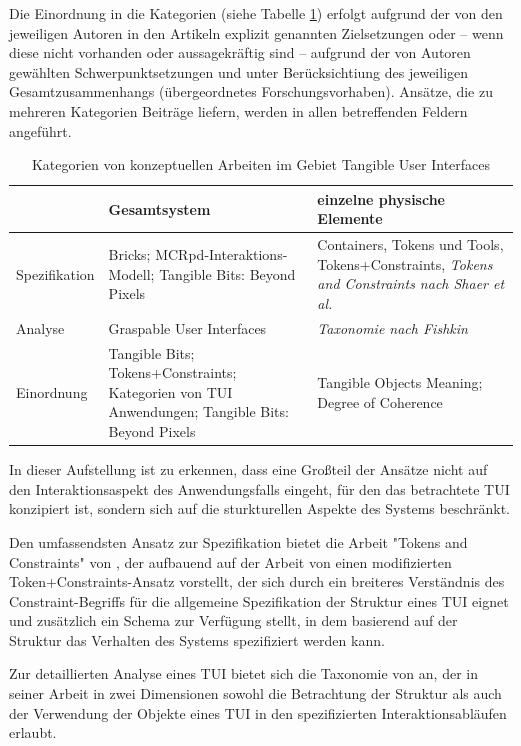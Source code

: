 Die Einordnung in die Kategorien (siehe Tabelle \ref{tab:tui_konzeptkategorien}) erfolgt aufgrund der von den jeweiligen Autoren in den Artikeln explizit genannten Zielsetzungen oder -- wenn diese nicht vorhanden oder aussagekräftig sind -- aufgrund der von Autoren gewählten Schwerpunktsetzungen und unter Berücksichtiung des jeweiligen Gesamtzusammenhangs (übergeordnetes Forschungsvorhaben). Ansätze, die zu mehreren Kategorien Beiträge liefern, werden in allen betreffenden Feldern angeführt.

\begin{table}[htbp]
	\centering
	\caption{Kategorien von konzeptuellen Arbeiten im Gebiet Tangible User Interfaces}
	\begin{tabular}{| p{3cm} || p{7cm} | p{7cm} |} \hline
		 & Gesamtsystem & einzelne physische Elemente \\ \hline \hline
		Spezifikation & Bricks; MCRpd-Interaktions-Modell; Tangible Bits: Beyond Pixels & Containers, Tokens und Tools, Tokens+Constraints, \emph{Tokens and Constraints nach Shaer et al.}\\ \hline
		Analyse & Graspable User Interfaces & \emph{Taxonomie nach Fishkin} \\ \hline
		Einordnung & Tangible Bits; Tokens+Constraints; Kategorien von TUI Anwendungen; Tangible Bits: Beyond Pixels & Tangible Objects Meaning; Degree of Coherence \\ \hline
	\end{tabular}
	\label{tab:tui_konzeptkategorien}
\end{table}

In dieser Aufstellung ist zu erkennen, dass eine Großteil der Ansätze nicht auf den  Interaktionsaspekt des Anwendungsfalls eingeht, für den das betrachtete \gls{TUI} konzipiert ist, sondern sich auf die sturkturellen Aspekte des Systems beschränkt.  

Den umfassendsten Ansatz zur Spezifikation bietet die Arbeit "Tokens and Constraints" von \citep{Shaer04}, der aufbauend auf der Arbeit von \citet{Ullmer02} einen modifizierten Token+Constraints-Ansatz vorstellt, der sich durch ein breiteres Verständnis des Constraint-Begriffs für die allgemeine Spezifikation der Struktur eines TUI eignet und zusätzlich ein Schema zur Verfügung stellt, in dem basierend auf der Struktur das Verhalten des Systems spezifiziert werden kann.

Zur detaillierten Analyse eines \gls{TUI} bietet sich die Taxonomie von \citet{Fishkin04} an, der in seiner Arbeit in zwei Dimensionen sowohl die Betrachtung der Struktur als auch der Verwendung der Objekte eines \gls{TUI} in den spezifizierten Interaktionsabläufen erlaubt.


